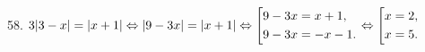 58. $3|3-x|=|x+1|\Leftrightarrow|9-3x|=|x+1|\Leftrightarrow\left[\begin{gathered}
     9-3x=x+1,\hfill\\
     9-3x=-x-1.\hfill \end{gathered}\right.\Leftrightarrow\left[\begin{gathered}
     x=2,\hfill\\
     x=5.\hfill \end{gathered}\right.$\\
